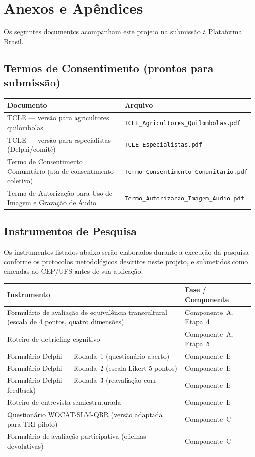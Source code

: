 \documentclass[12pt,a4paper,brazil]{article}
\begin{document}
\section{Anexos e Apêndices}

Os seguintes documentos acompanham este projeto na submissão à Plataforma Brasil.

\subsection*{Termos de Consentimento (prontos para submissão)}

\begin{longtable}{p{7cm}p{5cm}}
\toprule
\textbf{Documento} & \textbf{Arquivo} \\
\midrule
\endhead
TCLE --- versão para agricultores quilombolas & \texttt{TCLE\_Agricultores\_Quilombolas.pdf} \\
TCLE --- versão para especialistas (Delphi/comitê) & \texttt{TCLE\_Especialistas.pdf} \\
Termo de Consentimento Comunitário (ata de consentimento coletivo) & \texttt{Termo\_Consentimento\_Comunitario.pdf} \\
Termo de Autorização para Uso de Imagem e Gravação de Áudio & \texttt{Termo\_Autorizacao\_Imagem\_Audio.pdf} \\
\bottomrule
\end{longtable}

\subsection*{Instrumentos de Pesquisa}

Os instrumentos listados abaixo serão elaborados durante a execução da pesquisa conforme os protocolos metodológicos descritos neste projeto, e submetidos como emendas ao CEP/UFS antes de sua aplicação.

\begin{longtable}{p{7cm}p{5cm}}
\toprule
\textbf{Instrumento} & \textbf{Fase / Componente} \\
\midrule
\endhead
Formulário de avaliação de equivalência transcultural (escala de 4 pontos, quatro dimensões) & Componente~A, Etapa~4 \\
Roteiro de debriefing cognitivo & Componente~A, Etapa~5 \\
Formulário Delphi --- Rodada~1 (questionário aberto) & Componente~B \\
Formulário Delphi --- Rodada~2 (escala Likert 5 pontos) & Componente~B \\
Formulário Delphi --- Rodada~3 (reavaliação com feedback) & Componente~B \\
Roteiro de entrevista semiestruturada & Componente~B \\
Questionário WOCAT-SLM-QBR (versão adaptada para TRI piloto) & Componente~C \\
Formulário de avaliação participativa (oficinas devolutivas) & Componente~C \\
\bottomrule
\end{longtable}
\end{document}
